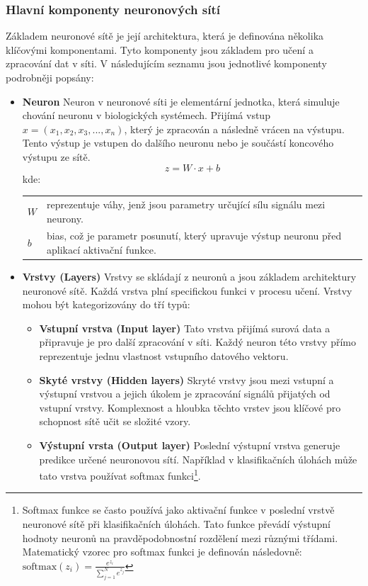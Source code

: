 \documentclass[male,czech,api_ing]{thesis}
\makeatletter
\newenvironment{conditions}[1][kde:]
    {#1 \begin{tabular}[t]{>{$}l<{$} @{${}={}$} >{\raggedright\arraybackslash}p{10cm}}}
    {\end{tabular}}
\makeatother
\begin{document}
\subsubsection{Hlavní komponenty neuronových sítí}
Základem neuronové sítě je její architektura, která je definována několika klíčovými komponentami. Tyto komponenty jsou základem pro učení a zpracování dat v síti. V následujícím seznamu jsou jednotlivé komponenty podrobněji popsány:

\begin{itemize}
    \item \textbf{Neuron} Neuron v neuronové síti je elementární jednotka, která simuluje chování neuronu v biologických systémech. Přijímá vstup $x = (x_1, x_2, x_3, ..., x_n)$, který je zpracován a následně vrácen na výstupu. Tento výstup je vstupen do dalšího neuronu nebo je součástí koncového výstupu ze sítě.
        \begin{equation}
            z = W \cdot x + b
        \end{equation}
        \begin{conditions}
            W & reprezentuje váhy, jenž jsou parametry určující sílu signálu mezi neurony. \\
            b & bias, což je parametr posunutí, který upravuje výstup neuronu před aplikací aktivační funkce.
        \end{conditions}
    \item \textbf{Vrstvy (Layers)} Vrstvy se skládají z neuronů a jsou základem architektury neuronové sítě. Každá vrstva plní specifickou funkci v procesu učení. Vrstvy mohou být kategorizovány do tří typů:
        \begin{itemize}
            \item \textbf{Vstupní vrstva (Input layer)} Tato vrstva přijímá surová data a připravuje je pro další zpracování v síti. Každý neuron této vrstvy přímo reprezentuje jednu vlastnost vstupního datového vektoru.
            \item \textbf{Skyté vrstvy (Hidden layers)} Skryté vrstvy jsou mezi vstupní a výstupní vrstvou a jejich úkolem je zpracování signálů přijatých od vstupní vrstvy. Komplexnost a hloubka těchto vrstev jsou klíčové pro schopnost sítě učit se složité vzory.
            \item \textbf{Výstupní vrsta (Output layer) } Poslední výstupní vrstva generuje predikce určené neuronovou sítí. Například v klasifikačních úlohách může tato vrstva používat softmax funkci\footnote{Softmax funkce se často používá jako aktivační funkce v poslední vrstvě neuronové sítě při klasifikačních úlohách. Tato funkce převádí výstupní hodnoty neuronů na pravděpodobnostní rozdělení mezi různými třídami. Matematický vzorec pro softmax funkci je definován následovně: $\text{softmax}(z_i) = \frac{e^{z_i}}{\sum_{j=1}^{N} e^{z_j}}$}.

\end{itemize}
\end{itemize}
\end{document}
